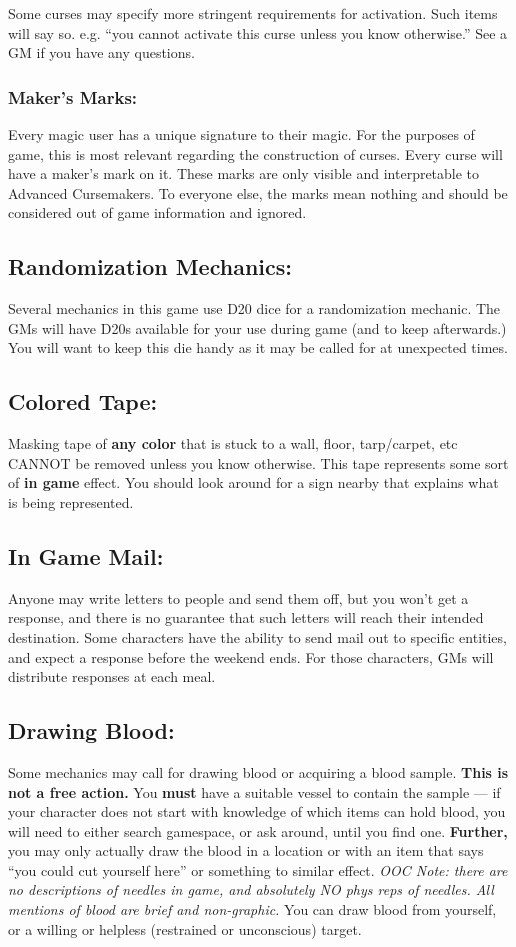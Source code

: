 \documentclass[sheet]{GL2020}
\begin{document}
{Some curses may specify more stringent requirements for activation. Such items will say so. e.g. ``you cannot activate this curse unless you know otherwise.'' See a GM if you have any questions.

\subsubsection{Maker's Marks:}
Every magic user has a unique signature to their magic. For the purposes of game, this is most relevant regarding the construction of curses. Every curse will have a maker's mark on it. These marks are only visible and interpretable to Advanced Cursemakers. To everyone else, the marks mean nothing and should be considered out of game information and ignored. 

\subsection{Randomization Mechanics:}
Several mechanics in this game use D20 dice for a randomization mechanic. The GMs will have D20s available for your use during game (and to keep afterwards.) You will want to keep this die handy as it may be called for at unexpected times.

\subsection{Colored Tape:}
Masking tape of \textbf{any color} that is stuck to a wall, floor, tarp/carpet, etc CANNOT be removed unless you know otherwise. This tape represents some sort of \textbf{in game} effect. You should look around for a sign nearby that explains what is being represented.

\subsection{In Game Mail:}
Anyone may write letters to people and send them off, but you won't get a response, and there is no guarantee that such letters will reach their intended destination. Some characters have the ability to send mail out to specific entities, and expect a response before the weekend ends. For those characters, GMs will distribute responses at each meal. 

\subsection{Drawing Blood:}
Some mechanics may call for drawing blood or acquiring a blood sample. \textbf{This is not a free action.} You \textbf{must} have a suitable vessel to contain the sample — if your character does not start with knowledge of which items can hold blood, you will need to either search gamespace, or ask around, until you find one. \textbf{Further,} you may only actually draw the blood in a location or with an item that says ``you could cut yourself here'' or something to similar effect. \emph{OOC Note: there are no descriptions of needles in game, and absolutely NO phys reps of needles. All mentions of blood are brief and non-graphic.} You can draw blood from yourself, or a willing or helpless (restrained or unconscious) target.

}
\end{document}
